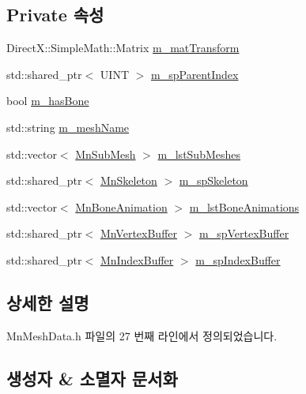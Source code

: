 \subsection*{Private 속성}
\begin{DoxyCompactItemize}
\item 
Direct\+X\+::\+Simple\+Math\+::\+Matrix \hyperlink{class_m_n_l_1_1_mn_mesh_data_a32634c82d36b16309ccd823aad588b9f}{m\+\_\+mat\+Transform}
\item 
std\+::shared\+\_\+ptr$<$ U\+I\+NT $>$ \hyperlink{class_m_n_l_1_1_mn_mesh_data_aa621a08d7f66033a797261bae12a4c18}{m\+\_\+sp\+Parent\+Index}
\item 
bool \hyperlink{class_m_n_l_1_1_mn_mesh_data_a6285c888b6d027103887f2457088fb9b}{m\+\_\+has\+Bone}
\item 
std\+::string \hyperlink{class_m_n_l_1_1_mn_mesh_data_a0d3c6b9633cadd22858273fac2751b26}{m\+\_\+mesh\+Name}
\item 
std\+::vector$<$ \hyperlink{struct_m_n_l_1_1_mn_sub_mesh}{Mn\+Sub\+Mesh} $>$ \hyperlink{class_m_n_l_1_1_mn_mesh_data_ad81b9296d62dcd2d53206f58654b581d}{m\+\_\+lst\+Sub\+Meshes}
\item 
std\+::shared\+\_\+ptr$<$ \hyperlink{class_m_n_l_1_1_mn_skeleton}{Mn\+Skeleton} $>$ \hyperlink{class_m_n_l_1_1_mn_mesh_data_a04f503f266ee9d9a01567c64e3b2367a}{m\+\_\+sp\+Skeleton}
\item 
std\+::vector$<$ \hyperlink{class_m_n_l_1_1_mn_bone_animation}{Mn\+Bone\+Animation} $>$ \hyperlink{class_m_n_l_1_1_mn_mesh_data_aae25c134a51b1baffbc6fe27b9361c62}{m\+\_\+lst\+Bone\+Animations}
\item 
std\+::shared\+\_\+ptr$<$ \hyperlink{class_m_n_l_1_1_mn_vertex_buffer}{Mn\+Vertex\+Buffer} $>$ \hyperlink{class_m_n_l_1_1_mn_mesh_data_aa831d4cca73f55e0c67f47baee413ad3}{m\+\_\+sp\+Vertex\+Buffer}
\item 
std\+::shared\+\_\+ptr$<$ \hyperlink{class_m_n_l_1_1_mn_index_buffer}{Mn\+Index\+Buffer} $>$ \hyperlink{class_m_n_l_1_1_mn_mesh_data_ac16837b09de7b25bd981d168488ed9f1}{m\+\_\+sp\+Index\+Buffer}
\end{DoxyCompactItemize}


\subsection{상세한 설명}


Mn\+Mesh\+Data.\+h 파일의 27 번째 라인에서 정의되었습니다.



\subsection{생성자 \& 소멸자 문서화}
\mbox{\label{class_m_n_l_1_1_mn_mesh_data_a6012a2d40228be1313a3188b7a1eefcd}} 
